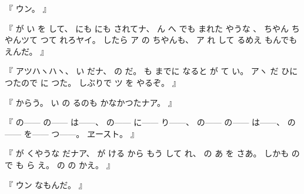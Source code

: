 %
『
ウン。
』

%
『
が
い
を
して、
%
にも
にも
されてナ、
%
ん
へ
でも
まれた
やうな
、
%
ちやん
ちやんツて
つて
れろヤイ。
%
したら
ア
の
ちやんも、
%
ア
れ
して
るめえ
もんでも
えんだ。
』

%
『
アツハヽハヽ、
%
い
だナ、
%
の
だ。
%
も
までに
なると
が
て
い。
%
アヽ
だ
ひに
つたので
に
つた。%
%
しぶりで
ツ
を
やるぞ。
』

%
『
からう。
%
い
の
るのも
かなかつたナア。
』

%
『
の{---}{---}
の{---}{---}
は{---}{---}、
%
の{---}{---}
に{---}{---}
り{---}{---}、
%
の{---}{---}
の{---}{---}
は{---}{---}、
%
の{---}{---}
を{---}{---}
つ{---}{---}。
%
ヱースト。
』

%
『
が
くやうな
だナア、
%
が
ける
から
もう
して%
れ、
%
の%
あ
を
さあ。
%
しかも
の
で
も
ら
え。
%
の
の
かえ。
』

%
『
ウン
なもんだ。
』

